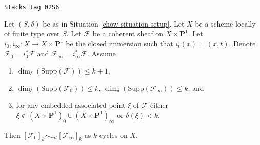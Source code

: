 \begin{lemma}
\label{chow-lemma-coherent-sheaf-cross-p1}
\href{https://stacks.math.columbia.edu/tag/02S6}{\texttt{Stacks tag 02S6}}

Let $(S, \delta)$ be as in Situation \ref{chow-situation-setup}.
Let $X$ be a scheme locally of finite type over $S$.
Let $\mathcal{F}$ be a coherent sheaf on $X \times \mathbf{P}^1$.
Let $i_0, i_\infty : X \to X \times \mathbf{P}^1$ be the closed immersion
such that $i_t(x) = (x, t)$. Denote $\mathcal{F}_0 = i_0^*\mathcal{F}$ and
$\mathcal{F}_\infty = i_\infty^*\mathcal{F}$.
Assume
\begin{enumerate}
\item $\dim_\delta(\text{Supp}(\mathcal{F})) \leq k + 1$,
\item $\dim_\delta(\text{Supp}(\mathcal{F}_0)) \leq k$,
$\dim_\delta(\text{Supp}(\mathcal{F}_\infty)) \leq k$, and
\item for any embedded associated point $\xi$ of $\mathcal{F}$ either
$\xi \not \in (X \times \mathbf{P}^1)_0 \cup (X \times \mathbf{P}^1)_\infty$
or $\delta(\xi) < k$.
\end{enumerate}
Then $[\mathcal{F}_0]_k \sim_{rat} [\mathcal{F}_\infty]_k$ as $k$-cycles on $X$.
\end{lemma}

